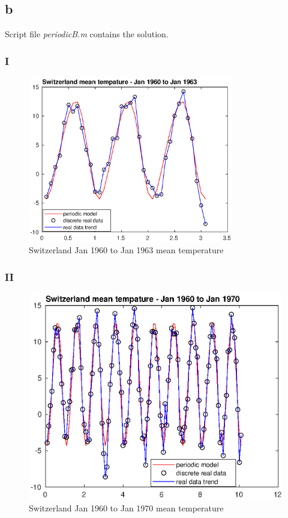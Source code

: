 \documentclass[unicode,11pt,a4paper,oneside,numbers=endperiod,openany]{scrartcl}
\begin{document}
\subsection*{b}

Script file \textit{periodicB.m} contains the solution.

\subsubsection*{I}

\begin{figure}[H]
    \centering
    \caption{Switzerland Jan 1960 to Jan 1963 mean temperature}
    \label{fig:ex3b-i}
    \includegraphics[width=0.8\textwidth]{ex3b-i.eps}
\end{figure}

\subsubsection*{II}

\begin{figure}[H]
    \centering
    \caption{Switzerland Jan 1960 to Jan 1970 mean temperature}
    \label{fig:ex3b-ii}
    \includegraphics[width=\textwidth]{ex3b-ii.eps}
\end{figure}
\end{document}
